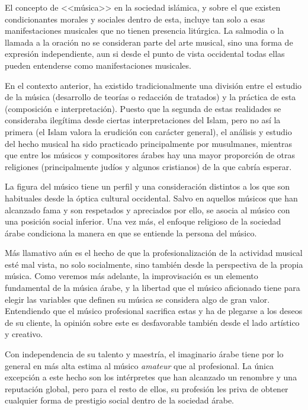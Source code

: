     El concepto de <<música>> en la sociedad islámica, y sobre el que existen condicionantes morales y sociales dentro de esta, incluye tan solo a esas manifestaciones musicales que no tienen presencia litúrgica. La salmodia o la llamada a la oración no se consideran parte del arte musical, sino una forma de expresión independiente, aun si desde el punto de vista occidental todas ellas pueden entenderse como manifestaciones musicales.

    En el contexto anterior, ha existido tradicionalmente una división entre el estudio de la música (desarrollo de teorías o redacción de tratados) y la práctica de esta (composición e interpretación). Puesto que la segunda de estas realidades se consideraba ilegítima desde ciertas interpretaciones del Islam, pero no así la primera (el Islam valora la erudición con carácter general), el análisis y estudio del hecho musical ha sido practicado principalmente por musulmanes, mientras que entre los músicos y compositores árabes hay una mayor proporción de otras religiones (principalmente judíos y algunos cristianos) de la que cabría esperar.

    La figura del músico tiene un perfil y una consideración distintos a los que son habituales desde la óptica cultural occidental. Salvo en aquellos músicos que han alcanzado fama y son respetados y apreciados por ello, se asocia al músico con una posición social inferior. Una vez más, el enfoque religioso de la sociedad árabe condiciona la manera en que se entiende la persona del músico.

    Más llamativo aún es el hecho de que la profesionalización de la actividad musical esté mal vista, no solo socialmente, sino también desde la perspectiva de la propia música. Como veremos más adelante, la improvisación es un elemento fundamental de la música árabe, y la libertad que el músico aficionado tiene para elegir las variables que definen su música se considera algo de gran valor. Entendiendo que el músico profesional sacrifica estas y ha de plegarse a los deseos de su cliente, la opinión sobre este es desfavorable también desde el lado artístico y creativo.

    Con independencia de su talento y maestría, el imaginario árabe tiene por lo general en más alta estima al músico \emph{amateur} que al profesional. La única excepción a este hecho son los intérpretes que han alcanzado un renombre y una reputación global, pero para el resto de ellos, su profesión les priva de obtener cualquier forma de prestigio social dentro de la sociedad árabe.

